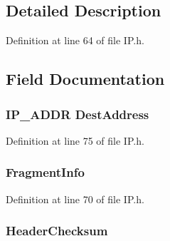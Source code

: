 \subsection{Detailed Description}


Definition at line 64 of file I\+P.\+h.



\subsection{Field Documentation}
\hypertarget{struct___i_p___h_e_a_d_e_r_a3116a419f3c363294726255181ca77c7}{}
\subsubsection[{Dest\+Address}]{\setlength{\rightskip}{0pt plus 5cm}I\+P\+\_\+\+A\+D\+D\+R Dest\+Address}\label{struct___i_p___h_e_a_d_e_r_a3116a419f3c363294726255181ca77c7}


Definition at line 75 of file I\+P.\+h.

\hypertarget{struct___i_p___h_e_a_d_e_r_a40563683dc3368bf18af8113d4b0e027}{}
\subsubsection[{Fragment\+Info}]{ Fragment\+Info}\label{struct___i_p___h_e_a_d_e_r_a40563683dc3368bf18af8113d4b0e027}


Definition at line 70 of file I\+P.\+h.

\hypertarget{struct___i_p___h_e_a_d_e_r_ae813081f1a360c41b97d41320089eaeb}{}
\subsubsection[{Header\+Checksum}]{ Header\+Checksum}\label{struct___i_p___h_e_a_d_e_r_ae813081f1a360c41b97d41320089eaeb}


